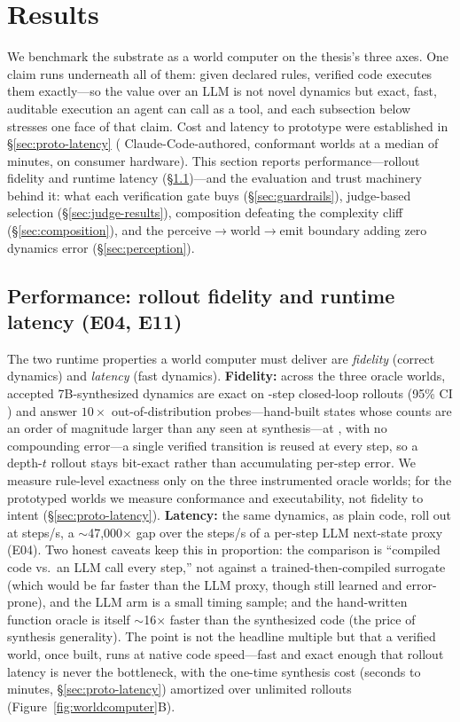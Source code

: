 \documentclass[11pt]{article}
\begin{document}
\section{Results}\label{sec:results}
We benchmark the substrate as a world computer on the thesis's three axes. One claim runs
underneath all of them: given declared rules, verified code executes them exactly---so the
value over an LLM is not novel dynamics but exact, fast, auditable execution an agent can call as
a tool, and each subsection below stresses one face of that claim. Cost and
latency to prototype were established in \S\ref{sec:proto-latency} (\ProtoNumWorlds{} Claude-Code-authored, conformant
worlds at a median of \ProtoMedianMinutes{} minutes, on consumer hardware). This section reports
performance---rollout fidelity and runtime latency (\S\ref{sec:perf})---and the
evaluation and trust machinery behind it: what each verification gate buys
(\S\ref{sec:guardrails}), judge-based selection (\S\ref{sec:judge-results}), composition
defeating the complexity cliff (\S\ref{sec:composition}), and the perceive$\to$world$\to$emit
boundary adding zero dynamics error (\S\ref{sec:perception}).

\subsection{Performance: rollout fidelity and runtime latency (E04, E11)}\label{sec:perf}
The two runtime properties a world computer must deliver are \emph{fidelity} (correct dynamics)
and \emph{latency} (fast dynamics). \textbf{Fidelity:} across the three oracle worlds, accepted
7B-synthesized dynamics are exact on \MultiCodeExact{} \RolloutSteps-step closed-loop rollouts
(95\% CI \MultiCodeCI) and answer $10\times$ out-of-distribution probes---hand-built states whose counts are an order of
magnitude larger than any seen at synthesis---at \CodeOODRate{}, with no
compounding error---a single verified transition is reused at every step, so a depth-$t$ rollout
stays bit-exact rather than accumulating per-step error. We measure rule-level exactness only on
the three instrumented oracle worlds; for the \ProtoNumWorlds{} prototyped worlds we measure
conformance and executability, not fidelity to intent (\S\ref{sec:proto-latency}). \textbf{Latency:}
the same dynamics, as plain code, roll out at \CodeStepsPerSec{} steps/s, a $\sim$47{,}000$\times$
gap over the \LLMStepsPerSec{} steps/s of a per-step LLM next-state proxy (E04). Two honest
caveats keep this in proportion: the comparison is ``compiled code vs.\ an LLM call every step,''
not against a trained-then-compiled surrogate (which would be far faster than the LLM proxy,
though still learned and error-prone), and the LLM arm is a small timing sample; and the
hand-written function oracle is itself $\sim$16$\times$ faster than the synthesized code (the price
of synthesis generality). The point is not the headline multiple but that a verified world, once
built, runs at native code speed---fast and exact enough that rollout latency is never the
bottleneck, with the one-time synthesis cost (seconds to minutes, \S\ref{sec:proto-latency}) amortized
over unlimited rollouts (Figure~\ref{fig:worldcomputer}B).
\end{document}
